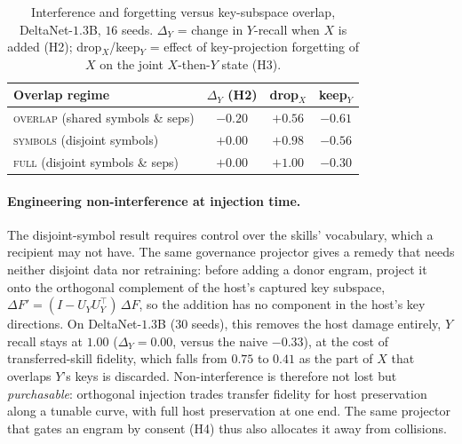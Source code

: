 \documentclass[11pt]{article}
\theoremstyle{definition}
\newcommand{\F}{F}
\begin{document}
\begin{table}[h]
\centering
\caption{Interference and forgetting versus key-subspace overlap, DeltaNet-$1.3$B, $16$ seeds. $\Delta_Y$ = change in $Y$-recall when $X$ is added (H2); drop$_X$/keep$_Y$ = effect of key-projection forgetting of $X$ on the joint $X$-then-$Y$ state (H3).}
\label{tab:disjoint}
\begin{tabular}{lccc}
\toprule
Overlap regime & $\Delta_Y$ (H2) & drop$_X$ & keep$_Y$ \\
\midrule
\textsc{overlap} (shared symbols \& seps) & $-0.20$ & $+0.56$ & $-0.61$ \\
\textsc{symbols} (disjoint symbols) & $+0.00$ & $+0.98$ & $-0.56$ \\
\textsc{full} (disjoint symbols \& seps) & $+0.00$ & $+1.00$ & $-0.30$ \\
\bottomrule
\end{tabular}
\end{table}

\paragraph{Engineering non-interference at injection time.}
The disjoint-symbol result requires control over the skills' vocabulary, which a recipient may not have. The same governance projector gives a remedy that needs neither disjoint data nor retraining: before adding a donor engram, project it onto the orthogonal complement of the host's captured key subspace, $\Delta\F' = (I-U_Y U_Y^\top)\,\Delta\F$, so the addition has no component in the host's key directions. On DeltaNet-$1.3$B ($30$ seeds), this removes the host damage entirely, $Y$ recall stays at $1.00$ ($\Delta_Y = 0.00$, versus the naive $-0.33$), at the cost of transferred-skill fidelity, which falls from $0.75$ to $0.41$ as the part of $X$ that overlaps $Y$'s keys is discarded. Non-interference is therefore not lost but \emph{purchasable}: orthogonal injection trades transfer fidelity for host preservation along a tunable curve, with full host preservation at one end. The same projector that gates an engram by consent (H4) thus also allocates it away from collisions.
\end{document}
